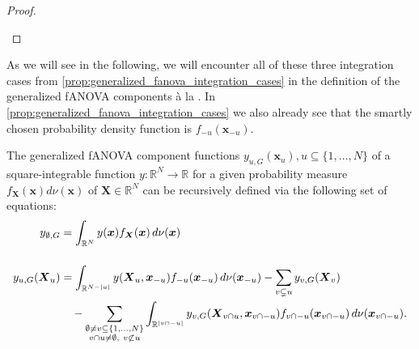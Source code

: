 \begin{proof}
\begin{center}
\end{center}
\end{proof}
As we will see in the following, we will encounter all of these three integration cases from \autoref{prop:generalized_fanova_integration_cases} in the definition of the generalized fANOVA components à la \cite{rahman2014}.
In \autoref{prop:generalized_fanova_integration_cases} we also already see that the smartly chosen probability density function is $f_{-u}(\boldsymbol{x}_{-u})$.
\begin{proposition}\label{prop:generalized_fanova_components_rahman}
The generalized fANOVA component functions \( y_{u,G}(\boldsymbol{x}_u), u \subseteq \{1,\dots,N\} \) of a square-integrable function $y:\mathbb{R}^N \to \mathbb{R}$ for a given probability measure $f_{\boldsymbol{X}}(\boldsymbol{x}) d\nu(\boldsymbol{x})$ of $\boldsymbol{X} \in \mathbb{R}^N$ can be recursively defined via the following set of equations:
\begin{align}
y_{\emptyset,G} &= \int_{\mathbb{R}^N} y(\boldsymbol{x}) f_{\boldsymbol{X}}(\boldsymbol{x}) \, d \nu(\boldsymbol{x}) \\[3ex]
y_{u,G}(\boldsymbol{X}_u) &= \int_{\mathbb{R}^{N - |u|}} y(\boldsymbol{X}_u, \boldsymbol{x}_{-u}) f_{-u}(\boldsymbol{x}_{-u}) \, d \nu(\boldsymbol{x}_{-u})
- \sum_{v \subsetneq u} y_{v,G}(\boldsymbol{X}_v) \notag \\
&\quad - \sum_{\substack{\emptyset \ne v \subseteq \{1,\dots,N\} \\ v \cap u \ne \emptyset,\ v \not\subset u}} 
\int_{\mathbb{R}^{|v \cap -u|}} y_{v,G}(\boldsymbol{X}_{v \cap u}, \boldsymbol{x}_{v \cap -u}) f_{v \cap -u}(\boldsymbol{x}_{v \cap -u}) \, d \nu(\boldsymbol{x}_{v \cap -u}).
\end{align}
\end{proposition}

